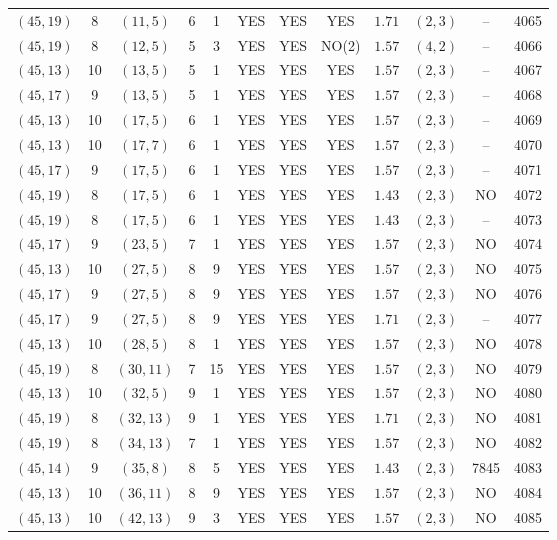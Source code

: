 \begin{longtable}{|c|c|c|c|c|c|c|c|c|c|c|c|}
$(45,19)$ & 8 & $(11,5)$ & 6 & 1 & YES & YES & YES & $1.71$ & $(2,3)$ & -- & 4065\\
$(45,19)$ & 8 & $(12,5)$ & 5 & 3 & YES & YES & NO(2) & $1.57$ & $(4,2)$ & -- & 4066\\
$(45,13)$ & 10 & $(13,5)$ & 5 & 1 & YES & YES & YES & $1.57$ & $(2,3)$ & -- & 4067\\
$(45,17)$ & 9 & $(13,5)$ & 5 & 1 & YES & YES & YES & $1.57$ & $(2,3)$ & -- & 4068\\
$(45,13)$ & 10 & $(17,5)$ & 6 & 1 & YES & YES & YES & $1.57$ & $(2,3)$ & -- & 4069\\
$(45,13)$ & 10 & $(17,7)$ & 6 & 1 & YES & YES & YES & $1.57$ & $(2,3)$ & -- & 4070\\
$(45,17)$ & 9 & $(17,5)$ & 6 & 1 & YES & YES & YES & $1.57$ & $(2,3)$ & -- & 4071\\
$(45,19)$ & 8 & $(17,5)$ & 6 & 1 & YES & YES & YES & $1.43$ & $(2,3)$ & NO & 4072\\
$(45,19)$ & 8 & $(17,5)$ & 6 & 1 & YES & YES & YES & $1.43$ & $(2,3)$ & -- & 4073\\
$(45,17)$ & 9 & $(23,5)$ & 7 & 1 & YES & YES & YES & $1.57$ & $(2,3)$ & NO & 4074\\
$(45,13)$ & 10 & $(27,5)$ & 8 & 9 & YES & YES & YES & $1.57$ & $(2,3)$ & NO & 4075\\
$(45,17)$ & 9 & $(27,5)$ & 8 & 9 & YES & YES & YES & $1.57$ & $(2,3)$ & NO & 4076\\
$(45,17)$ & 9 & $(27,5)$ & 8 & 9 & YES & YES & YES & $1.71$ & $(2,3)$ & -- & 4077\\
$(45,13)$ & 10 & $(28,5)$ & 8 & 1 & YES & YES & YES & $1.57$ & $(2,3)$ & NO & 4078\\
$(45,19)$ & 8 & $(30,11)$ & 7 & 15 & YES & YES & YES & $1.57$ & $(2,3)$ & NO & 4079\\
$(45,13)$ & 10 & $(32,5)$ & 9 & 1 & YES & YES & YES & $1.57$ & $(2,3)$ & NO & 4080\\
$(45,19)$ & 8 & $(32,13)$ & 9 & 1 & YES & YES & YES & $1.71$ & $(2,3)$ & NO & 4081\\
$(45,19)$ & 8 & $(34,13)$ & 7 & 1 & YES & YES & YES & $1.57$ & $(2,3)$ & NO & 4082\\
$(45,14)$ & 9 & $(35,8)$ & 8 & 5 & YES & YES & YES & $1.43$ & $(2,3)$ & 7845 & 4083\\
$(45,13)$ & 10 & $(36,11)$ & 8 & 9 & YES & YES & YES & $1.57$ & $(2,3)$ & NO & 4084\\
$(45,13)$ & 10 & $(42,13)$ & 9 & 3 & YES & YES & YES & $1.57$ & $(2,3)$ & NO & 4085\\

\end{longtable}
